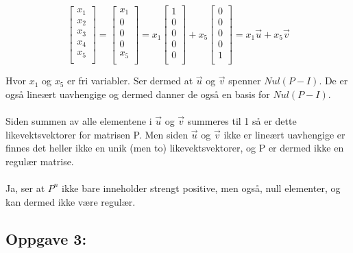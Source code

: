 \documentclass[a4paper, norsk, twoside, 10pt]{article}
\begin{document}
\begin{flushleft}
  \[ \begin{bmatrix}
    x_{1} \\
    x_{2} \\
    x_{3} \\
    x_{4} \\
    x_{5} \\
  \end{bmatrix}
  =
  \begin{bmatrix}
    x_{1} \\
    0 \\
    0 \\
    0 \\
    x_{5}\\
  \end{bmatrix}
  = x_{1}
  \begin{bmatrix}
    1 \\
    0 \\
    0 \\
    0 \\
    0 \\
  \end{bmatrix}
  + x_{5}
  \begin{bmatrix}
    0 \\
    0 \\
    0 \\
    0 \\
    1 \\
  \end{bmatrix}
  = x_{1}\vec{u} + x_{5}\vec{v}
  \]


  Hvor $x_{1}$ og $x_{5}$ er fri variabler. Ser dermed at $\vec{u}$ og $\vec{v}$ spenner $Nul(P-I)$. De er også lineært uavhengige og dermed danner de også en basis for $Nul(P-I)$.
  \ \\ \ \\
  Siden summen av alle elementene i $\vec{u}$ og $\vec{v}$ summeres til 1 så er dette likevektsvektorer for matrisen P. Men siden $\vec{u}$ og $\vec{v}$ ikke er lineært uavhengige er finnes det heller ikke en unik (men to) likevektsvektorer, og P er dermed ikke en regulær matrise.
  \ \\ \ \\
  Ja, ser at $P^{n}$ ikke bare inneholder strengt positive, men også, null elementer, og kan dermed ikke være regulær.
\newpage
  \subsection*{Oppgave 3:}

  \begin{tikzpicture}[->,>=stealth',shorten >=1pt,auto,node distance=3cm,
      thick,main node/.style={circle,draw,font=\sffamily\Large\bfseries}]


\end{tikzpicture}
\end{flushleft}
\end{document}
